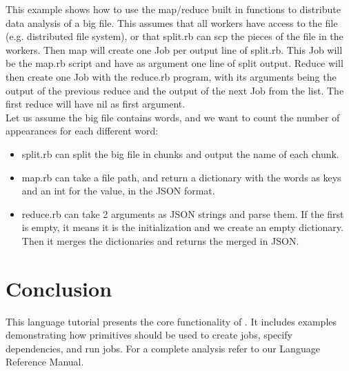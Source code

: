 This example shows how to use the map/reduce built in functions to distribute data
analysis of a big file. This assumes that all workers have access to the file (e.g.
distributed file system), or that split.rb can scp the pieces of the file in the workers.
Then map will create one Job per output line of split.rb. This Job will be the map.rb
script and have as argument one line of split output. Reduce will then create one Job
with the reduce.rb program, with its arguments being the output of the previous
reduce and the output of the next Job from the list. The first reduce will have
nil as first argument.\\
Let us assume the big file contains words, and we want to count the number of appearances for
each different word:
\begin{itemize}
  \item split.rb can split the big file in chunks and output the name of each chunk.
  \item map.rb can take a file path, and return a dictionary with the words as keys
    and an int for the value, in the JSON format.
  \item reduce.rb can take 2 arguments as JSON strings and parse them. If the first is
    empty, it means it is the initialization and we create an empty dictionary. Then it
    merges the dictionaries and returns the merged in JSON.
\end{itemize}


\section{Conclusion}
\label{sect:conclusion}
This language tutorial presents the core functionality of \lang{}. It includes examples
demonstrating how \lang{} primitives should be used to create jobs, specify dependencies, and run
jobs. For a complete analysis refer to our Language Reference Manual.
